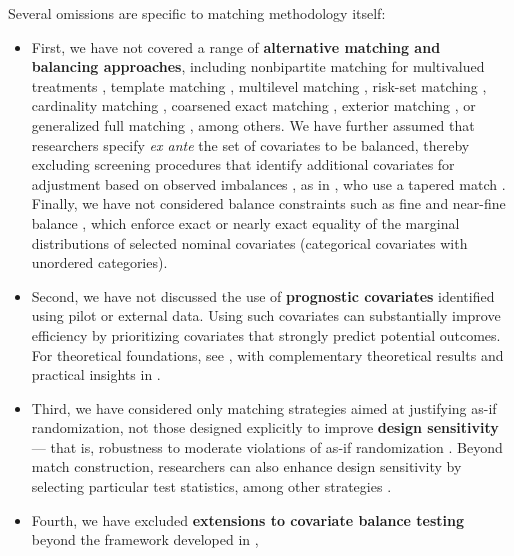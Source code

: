\documentclass[
  12pt,
  leqno]{article}
\begin{document}
Several omissions are specific to matching methodology itself:

\begin{itemize}
\item
  First, we have not covered a range of \textbf{alternative matching and
  balancing approaches}, including nonbipartite matching for multivalued
  treatments
  \citep[pp.~207--221]{luetal2001, luetal2011, rosenbaum2010}, template
  matching \citep{silberetal2014}, multilevel matching
  \citep{zubizarretakeele2017, pimenteletal2018}, risk-set matching
  \citep{lietal2001}, cardinality matching \citep{zubizarretaetal2014},
  coarsened exact matching \citep{iacusetal2012}, exterior matching
  \citep{rosenbaumsilber2013}, or generalized full matching
  \citep{savjeetal2021}, among others. We have further assumed that
  researchers specify \emph{ex ante} the set of covariates to be
  balanced, thereby excluding screening procedures that identify
  additional covariates for adjustment based on observed imbalances
  \citep{cochran1965}, as in \citet{yuetal2021}, who use a tapered match
  \citep{danieletal2008}. Finally, we have not considered balance
  constraints such as fine and near-fine balance
  \citep{rosenbaumetal2007, yangetal2012, yu2023, pimenteletal2015a, pimenteletal2015b},
  which enforce exact or nearly exact equality of the marginal
  distributions of selected nominal covariates (categorical covariates
  with unordered categories).
\item
  Second, we have not discussed the use of \textbf{prognostic
  covariates} identified using pilot or external data. Using such
  covariates can substantially improve efficiency by prioritizing
  covariates that strongly predict potential outcomes. For theoretical
  foundations, see \citet{hansen2008a}, with complementary theoretical
  results and practical insights in \citet{salesetal2018}.
\item
  Third, we have considered only matching strategies aimed at justifying
  as-if randomization, not those designed explicitly to improve
  \textbf{design sensitivity} --- that is, robustness to moderate
  violations of as-if randomization \citep[see][Part III,
  pp.~257--311]{rosenbaum2010}. Beyond match construction, researchers
  can also enhance design sensitivity by selecting particular test
  statistics, among other strategies
  \citep{rosenbaum2004, helleretal2009, hsuetal2013, smalletal2013}.
\item
  Fourth, we have excluded \textbf{extensions to covariate balance
  testing} beyond the framework developed in \citet{hansenbowers2008},

\end{itemize}
\end{document}
